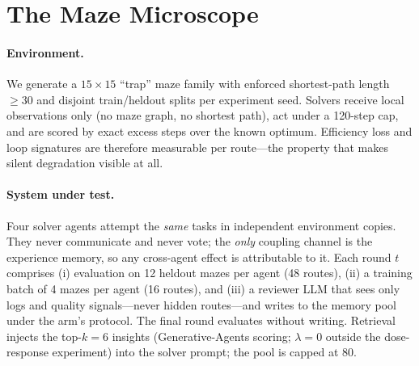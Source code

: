 \documentclass[11pt]{article}
\begin{document}
\section{The Maze Microscope}\label{sec:method}

\paragraph{Environment.} We generate a $15\times15$ ``trap'' maze family with enforced
shortest-path length $\geq 30$ and disjoint train/heldout splits per experiment seed. Solvers
receive local observations only (no maze graph, no shortest path), act under a 120-step cap,
and are scored by exact excess steps over the known optimum. Efficiency loss and loop
signatures are therefore measurable per route---the property that makes silent degradation
visible at all.

\paragraph{System under test.} Four solver agents attempt the \emph{same} tasks in independent
environment copies. They never communicate and never vote; the \emph{only} coupling channel is
the experience memory, so any cross-agent effect is attributable to it. Each round $t$
comprises (i) evaluation on 12 heldout mazes per agent (48 routes), (ii) a training batch of
4 mazes per agent (16 routes), and (iii) a reviewer LLM that sees only logs and quality
signals---never hidden routes---and writes to the memory pool under the arm's protocol. The
final round evaluates without writing. Retrieval injects the top-$k{=}6$ insights
(Generative-Agents scoring; $\lambda{=}0$ outside the dose-response experiment) into the solver
prompt; the pool is capped at 80.
\end{document}
